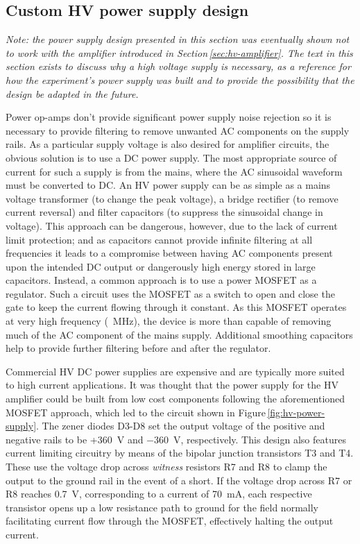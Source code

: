 \subsection{Custom HV power supply design}

\emph{Note: the power supply design presented in this section was eventually shown not to work with the amplifier introduced in Section\,\ref{sec:hv-amplifier}. The text in this section exists to discuss why a high voltage supply is necessary, as a reference for how the experiment's power supply was built and to provide the possibility that the design be adapted in the future.}

Power op-amps don't provide significant power supply noise rejection so it is necessary to provide filtering to remove unwanted \gls{AC} components on the supply rails. As a particular supply voltage is also desired for amplifier circuits, the obvious solution is to use a \gls{DC} power supply. The most appropriate source of current for such a supply is from the mains, where the \gls{AC} sinusoidal waveform must be converted to \gls{DC}. An \gls{HV} power supply can be as simple as a mains voltage transformer (to change the peak voltage), a bridge rectifier (to remove current reversal) and filter capacitors (to suppress the sinusoidal change in voltage). This approach can be dangerous, however, due to the lack of current limit protection; and as capacitors cannot provide infinite filtering at all frequencies it leads to a compromise between having \gls{AC} components present upon the intended \gls{DC} output or dangerously high energy stored in large capacitors. Instead, a common approach is to use a power \gls{MOSFET} as a regulator. Such a circuit uses the \gls{MOSFET} as a switch to open and close the gate to keep the current flowing through it constant. As this \gls{MOSFET} operates at very high frequency (\SI{}{\mega\hertz}), the device is more than capable of removing much of the \gls{AC} component of the mains supply. Additional smoothing capacitors help to provide further filtering before and after the regulator.

Commercial \gls{HV} \gls{DC} power supplies are expensive and are typically more suited to high current applications. It was thought that the power supply for the \gls{HV} amplifier could be built from low cost components following the aforementioned \gls{MOSFET} approach, which led to the circuit shown in Figure\,\ref{fig:hv-power-supply}. The zener diodes D3-D8 set the output voltage of the positive and negative rails to be +\SI{360}{\volt} and \SI{-360}{\volt}, respectively. This design also features current limiting circuitry by means of the bipolar junction transistors T3 and T4. These use the voltage drop across \emph{witness} resistors R7 and R8 to clamp the output to the ground rail in the event of a short. If the voltage drop across R7 or R8 reaches \SI{0.7}{\volt}, corresponding to a current of \SI{70}{\milli\ampere}, each respective transistor opens up a low resistance path to ground for the field normally facilitating current flow through the \gls{MOSFET}, effectively halting the output current.

